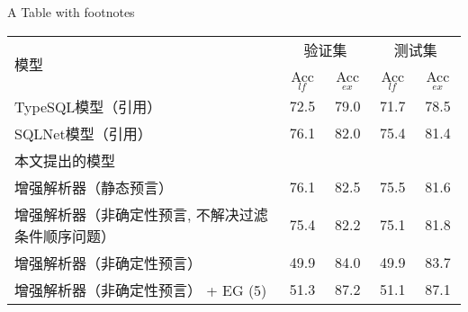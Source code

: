 \begin{table}[!htpb]
    {A Table with footnotes}
  \label{tab:wzyzjhcsjdzqd}
  \centering
  \begin{threeparttable}[b]
     \begin{tabular}{lcccc}
      \toprule
      \multirow{2}{10mm}{模型}&\multicolumn{2}{c}{验证集} & \multicolumn{2}{c}{测试集}\\
      \cmidrule(lr){2-3}\cmidrule(lr){4-5}
      & Acc$_{lf}$ & Acc$_{ex}$ & Acc$_{lf}$ & Acc$_{ex}$\\
      \midrule
      TypeSQL模型（引用） & 72.5 & 79.0 & 71.7 & 78.5\\
      SQLNet模型（引用） & 76.1 & 82.0 & 75.4 & 81.4\\
      \midrule 
      本文提出的模型 &  &  &  & \\
      增强解析器（静态预言） & 76.1 & 82.5 & 75.5 & 81.6\\
      增强解析器（非确定性预言, 不解决过滤条件顺序问题） & 75.4 & 82.2 & 75.1 & 81.8\\
      增强解析器（非确定性预言） & 49.9 & 84.0 & 49.9 & 83.7\\
      增强解析器（非确定性预言） + EG (5) & 51.3 & 87.2 & 51.1 & 87.1\\
      \bottomrule
    \end{tabular}
  \end{threeparttable}
\end{table}


